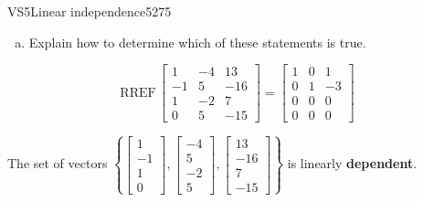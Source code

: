 \begin{exercise}{VS5}{Linear independence}{5275}
\begin{exerciseStatement}
\begin{enumerate}[(a)]
     
\item  

 Explain how to determine which of these statements is true. 

 
\end{enumerate}

     \end{exerciseStatement}
 \begin{exerciseAnswer} 

 \[
\mathrm{RREF}\, \left[\begin{array}{ccc}
1 & -4 & 13 \\
-1 & 5 & -16 \\
1 & -2 & 7 \\
0 & 5 & -15
\end{array}\right] = \left[\begin{array}{ccc}
1 & 0 & 1 \\
0 & 1 & -3 \\
0 & 0 & 0 \\
0 & 0 & 0
\end{array}\right]
            \] 

 

 The set of vectors \(\left\{ \left[\begin{array}{c}
1 \\
-1 \\
1 \\
0
\end{array}\right] , \left[\begin{array}{c}
-4 \\
5 \\
-2 \\
5
\end{array}\right] , \left[\begin{array}{c}
13 \\
-16 \\
7 \\
-15
\end{array}\right] \right\}\) is linearly \textbf{dependent}. 

 \end{exerciseAnswer}
 \end{exercise}


